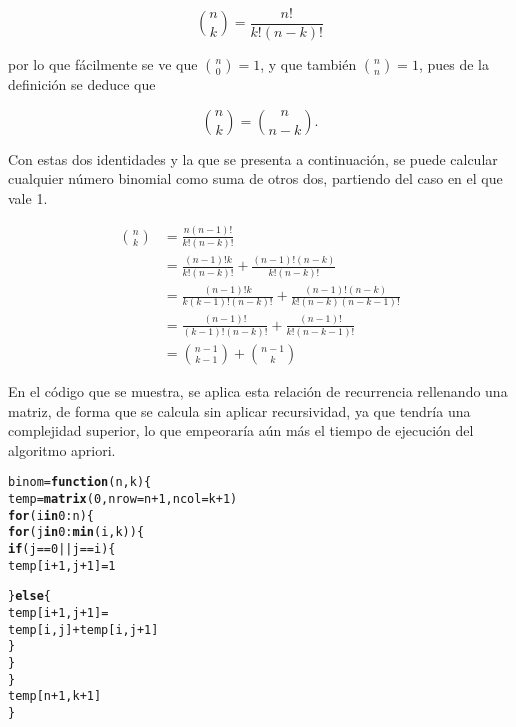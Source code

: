 \documentclass[12pt]{report}\usepackage[]{graphicx}\usepackage[dvipsnames]{xcolor}
\makeatletter
\newcommand{\hlnum}[1]{\textcolor[rgb]{0.686,0.059,0.569}{#1}}%
\newcommand{\hlopt}[1]{\textcolor[rgb]{0,0,0}{#1}}%
\newcommand{\hlstd}[1]{\textcolor[rgb]{0.345,0.345,0.345}{#1}}%
\newcommand{\hlkwa}[1]{\textcolor[rgb]{0.161,0.373,0.58}{\textbf{#1}}}%
\newcommand{\hlkwb}[1]{\textcolor[rgb]{0.69,0.353,0.396}{#1}}%
\newcommand{\hlkwc}[1]{\textcolor[rgb]{0.333,0.667,0.333}{#1}}%
\newcommand{\hlkwd}[1]{\textcolor[rgb]{0.737,0.353,0.396}{\textbf{#1}}}%
\newenvironment{kframe}{%
 \def\at@end@of@kframe{}%
 \ifinner\ifhmode%
  \def\at@end@of@kframe{\end{minipage}}%
  \begin{minipage}{\columnwidth}%
 \fi\fi%
 \def\FrameCommand##1{\hskip\@totalleftmargin \hskip-\fboxsep
 \colorbox{shadecolor}{##1}\hskip-\fboxsep
     \hskip-\linewidth \hskip-\@totalleftmargin \hskip\columnwidth}%
 \MakeFramed {\advance\hsize-\width
   \@totalleftmargin\z@ \linewidth\hsize
   \@setminipage}}%
 {\par\unskip\endMakeFramed%
 \at@end@of@kframe}
\newenvironment{knitrout}{}{} %
\makeatother
\begin{document}
			$$
			\binom{n}{k} = \frac{n!}{k!(n-k)!}
			$$
			
			\noindent por lo que fácilmente se ve que $\binom{n}{0} = 1$, y que también $\binom{n}{n} = 1$, pues de la definición se deduce que
			
			$$
			\binom{n}{k} = \binom{n}{n-k}. 
			$$
			
			Con estas dos identidades y la que se presenta a continuación, se puede calcular cualquier número binomial como suma de otros dos, partiendo del caso en el que vale 1. 
			
			\begin{align*}
				\binom{n}{k} &= \frac{n(n-1)!}{k!(n-k)!}\\
				&= \frac{(n-1)!k}{k!(n-k)!} + \frac{(n-1)!(n-k)}{k!(n-k)!}\\
				&= \frac{(n-1)!k}{k(k-1)!(n-k)!} + \frac{(n-1)!(n-k)}{k!(n-k)(n-k-1)!}\\
				&= \frac{(n-1)!}{(k-1)!(n-k)!} + \frac{(n-1)!}{k!(n-k-1)!}\\
				&= \binom{n-1}{k-1} + \binom{n-1}{k}
			\end{align*}
			
			En el código que se muestra, se aplica esta relación de recurrencia rellenando una matriz, de forma que se calcula sin aplicar recursividad, ya que tendría una complejidad superior, lo que empeoraría aún más el tiempo de ejecución del algoritmo apriori. 
			
\begin{knitrout}
\color{fgcolor}\begin{kframe}
\begin{alltt}
\hlstd{binom} \hlkwb{=} \hlkwa{function}\hlstd{(}\hlkwc{n}\hlstd{,} \hlkwc{k}\hlstd{) \{}
        \hlstd{temp} \hlkwb{=} \hlkwd{matrix}\hlstd{(}\hlnum{0}\hlstd{,} \hlkwc{nrow} \hlstd{= n} \hlopt{+} \hlnum{1}\hlstd{,} \hlkwc{ncol} \hlstd{= k} \hlopt{+} \hlnum{1}\hlstd{)}
        \hlkwa{for} \hlstd{(i} \hlkwa{in} \hlnum{0}\hlopt{:}\hlstd{n) \{}
                \hlkwa{for} \hlstd{(j} \hlkwa{in} \hlnum{0}\hlopt{:}\hlkwd{min}\hlstd{(i, k)) \{}
                        \hlkwa{if} \hlstd{(j} \hlopt{==} \hlnum{0} \hlopt{||} \hlstd{j} \hlopt{==} \hlstd{i) \{}
                                \hlstd{temp[i} \hlopt{+} \hlnum{1}\hlstd{, j} \hlopt{+} \hlnum{1}\hlstd{]} \hlkwb{=} \hlnum{1}

                        \hlstd{\}} \hlkwa{else} \hlstd{\{}
                                \hlstd{temp[i} \hlopt{+} \hlnum{1}\hlstd{, j} \hlopt{+} \hlnum{1}\hlstd{]} \hlkwb{=}
                                        \hlstd{temp[i, j]} \hlopt{+} \hlstd{temp[i, j} \hlopt{+} \hlnum{1}\hlstd{]}
                        \hlstd{\}}
                \hlstd{\}}
        \hlstd{\}}
        \hlstd{temp[n} \hlopt{+} \hlnum{1}\hlstd{, k} \hlopt{+} \hlnum{1}\hlstd{]}
\hlstd{\}}
\end{alltt}
\end{kframe}
\end{knitrout}
			
\end{document}
